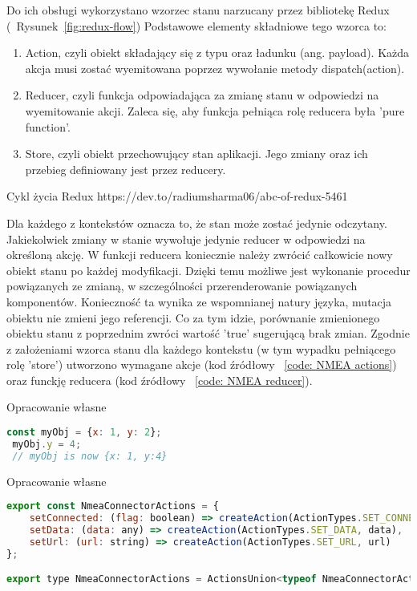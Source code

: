 \documentclass[skorowidz,skroty]{dyplomWEZUT}
\begin{document}
Do ich obsługi wykorzystano wzorzec stanu narzucany przez bibliotekę Redux (~Rysunek~\ref{fig:redux-flow}) Podstawowe elementy składniowe tego wzorca to:
\begin{enumerate}

	\item Action, czyli obiekt składający się z typu oraz ładunku (ang. payload). Każda akcja musi zostać wyemitowana poprzez wywołanie metody dispatch(action). 
	
	\item Reducer, czyli funkcja odpowiadająca za zmianę stanu w odpowiedzi na wyemitowanie akcji. Zaleca się, aby funkcja pełniąca rolę reducera była 'pure function'.  
	
	\item Store, czyli obiekt przechowujący stan aplikacji. Jego zmiany oraz ich przebieg definiowany jest przez reducery. 
	
\end{enumerate}

{Cykl życia Redux \label{fig:redux-flow}}
{https://dev.to/radiumsharma06/abc-of-redux-5461}

 Dla każdego z kontekstów oznacza to, że stan może zostać jedynie odczytany. Jakiekolwiek zmiany w stanie wywołuje jedynie reducer w odpowiedzi na określoną akcję. W funkcji reducera koniecznie należy zwrócić całkowicie nowy obiekt stanu po każdej modyfikacji. Dzięki temu możliwe jest wykonanie procedur powiązanych ze zmianą, w szczególności przerenderowanie powiązanych komponentów. Konieczność ta wynika ze wspomnianej natury języka, mutacja obiektu nie zmieni jego referencji. Co za tym idzie, porównanie zmienionego obiektu stanu z poprzednim zwróci wartość 'true' sugerującą brak zmian. Zgodnie z założeniami wzorca stanu dla każdego kontekstu (w tym wypadku pełniącego rolę 'store') utworzono wymagane akcje (kod źródłowy ~\ref{code: NMEA actions}) oraz funckję reducera (kod źródłowy ~\ref{code: NMEA reducer}).

{Opracowanie własne}{\label{code: js mutate}}
\begin{lstlisting}[language=JavaScript]
 const myObj = {x: 1, y: 2};
 myObj.y = 4;
 // myObj is now {x: 1, y:4}
\end{lstlisting}


{Opracowanie własne}{\label{code: NMEA actions}}
\begin{lstlisting}[language=JavaScript]
export const NmeaConnectorActions = {
    setConnected: (flag: boolean) => createAction(ActionTypes.SET_CONNECTED, flag),
    setData: (data: any) => createAction(ActionTypes.SET_DATA, data),
    setUrl: (url: string) => createAction(ActionTypes.SET_URL, url)
};

export type NmeaConnectorActions = ActionsUnion<typeof NmeaConnectorActions>;

\end{lstlisting}
\end{document}
